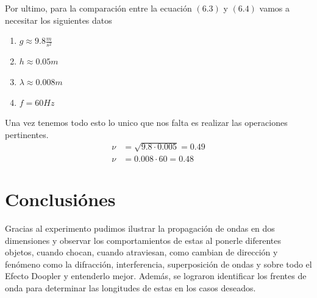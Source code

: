 \documentclass[a4paper, amsfonts, amssymb, amsmath, reprint, showkeys, nofootinbib, twoside]{revtex4-1}
\begin{document}
        Por ultimo, para la comparación entre la ecuación $(6.3)$ y $(6.4)$ vamos a necesitar los siguientes datos
        \begin{enumerate}
          \item $g\approx 9.8 \frac{m}{s^{2}}$
          \item $h\approx 0.05 m$
          \item $\lambda \approx 0.008 m$
          \item $f = 60 Hz$
        \end{enumerate}
        Una vez tenemos todo esto lo unico que nos falta es realizar las operaciones pertinentes.
        \begin{align*}
          \nu &= \sqrt{9.8\cdot 0.005} = 0.49\\
          \nu &= 0.008\cdot60 = 0.48
        \end{align*}
\section{Conclusiónes}
Gracias al experimento pudimos ilustrar la propagación de ondas en dos dimensiones y observar los comportamientos de estas al ponerle diferentes objetos, cuando chocan, cuando atraviesan, como cambian de dirección y fenómeno como la difracción, interferencia, superposición de ondas y sobre todo el Efecto Doopler y entenderlo mejor. Además, se lograron identificar los frentes de onda para determinar las longitudes de estas en los casos deseados.
\end{document}
